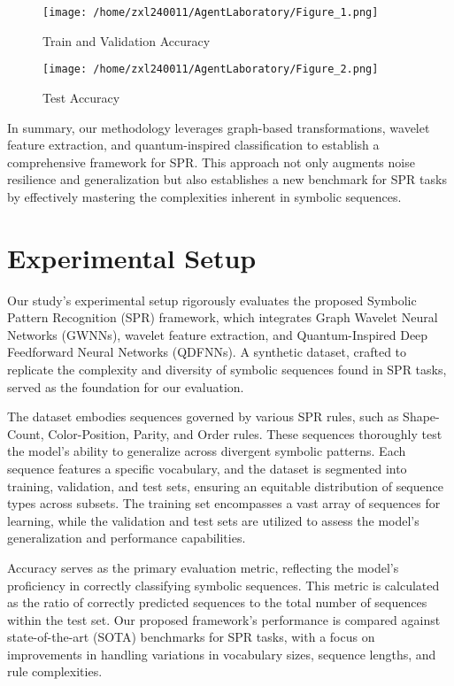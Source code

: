 \documentclass{article}
\begin{document}
\begin{figure}[h]
\caption{Train and Validation Accuracy}
\centering
\texttt{[image: /home/zxl240011/AgentLaboratory/Figure\_1.png]}
\label{fig:fig1}
\end{figure}

\begin{figure}[h]
\caption{Test Accuracy}
\centering
\texttt{[image: /home/zxl240011/AgentLaboratory/Figure\_2.png]}
\label{fig:fig2}
\end{figure}

In summary, our methodology leverages graph-based transformations, wavelet feature extraction, and quantum-inspired classification to establish a comprehensive framework for SPR. This approach not only augments noise resilience and generalization but also establishes a new benchmark for SPR tasks by effectively mastering the complexities inherent in symbolic sequences.

\section{Experimental Setup}

Our study's experimental setup rigorously evaluates the proposed Symbolic Pattern Recognition (SPR) framework, which integrates Graph Wavelet Neural Networks (GWNNs), wavelet feature extraction, and Quantum-Inspired Deep Feedforward Neural Networks (QDFNNs). A synthetic dataset, crafted to replicate the complexity and diversity of symbolic sequences found in SPR tasks, served as the foundation for our evaluation.

The dataset embodies sequences governed by various SPR rules, such as Shape-Count, Color-Position, Parity, and Order rules. These sequences thoroughly test the model's ability to generalize across divergent symbolic patterns. Each sequence features a specific vocabulary, and the dataset is segmented into training, validation, and test sets, ensuring an equitable distribution of sequence types across subsets. The training set encompasses a vast array of sequences for learning, while the validation and test sets are utilized to assess the model's generalization and performance capabilities.

Accuracy serves as the primary evaluation metric, reflecting the model's proficiency in correctly classifying symbolic sequences. This metric is calculated as the ratio of correctly predicted sequences to the total number of sequences within the test set. Our proposed framework's performance is compared against state-of-the-art (SOTA) benchmarks for SPR tasks, with a focus on improvements in handling variations in vocabulary sizes, sequence lengths, and rule complexities.
\end{document}
